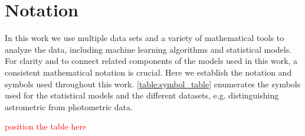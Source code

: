 \documentclass[twocolumn]{aastex631}
\newcommand{\TODO}[1]{{\textcolor{red}{#1}}}
\begin{document}
\appendix

\section{Notation} \label{app:notation}

    In this work we use multiple data sets and a variety of mathematical tools to analyze the data, including machine learning algorithms and statistical models.
    For clarity and to connect related components of the models used in this work, a consistent mathematical notation is crucial. Here we establish the notation and symbols used throughout this work.
    \autoref{table:symbol_table} enumerates the symbols used for the statistical models and the different datasets, e.g. distinguishing astrometric from photometric data. 

    \TODO{position the table here}
\end{document}
